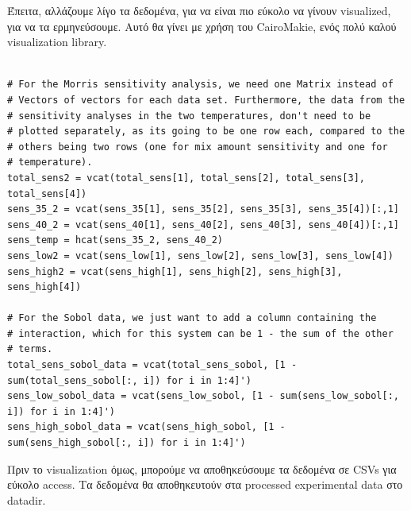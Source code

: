 \documentclass[11pt]{article}
\begin{document}
Έπειτα, αλλάζουμε λίγο τα δεδομένα, για να είναι πιο εύκολο να γίνουν visualized, για να τα ερμηνεύσουμε. Αυτό θα γίνει με χρήση του CairoMakie, ενός πολύ καλού visualization library.

\begin{verbatim}

# For the Morris sensitivity analysis, we need one Matrix instead of
# Vectors of vectors for each data set. Furthermore, the data from the
# sensitivity analyses in the two temperatures, don't need to be
# plotted separately, as its going to be one row each, compared to the
# others being two rows (one for mix amount sensitivity and one for
# temperature).
total_sens2 = vcat(total_sens[1], total_sens[2], total_sens[3], total_sens[4])
sens_35_2 = vcat(sens_35[1], sens_35[2], sens_35[3], sens_35[4])[:,1]
sens_40_2 = vcat(sens_40[1], sens_40[2], sens_40[3], sens_40[4])[:,1]
sens_temp = hcat(sens_35_2, sens_40_2)
sens_low2 = vcat(sens_low[1], sens_low[2], sens_low[3], sens_low[4])
sens_high2 = vcat(sens_high[1], sens_high[2], sens_high[3], sens_high[4])

# For the Sobol data, we just want to add a column containing the
# interaction, which for this system can be 1 - the sum of the other
# terms.
total_sens_sobol_data = vcat(total_sens_sobol, [1 - sum(total_sens_sobol[:, i]) for i in 1:4]')
sens_low_sobol_data = vcat(sens_low_sobol, [1 - sum(sens_low_sobol[:, i]) for i in 1:4]')
sens_high_sobol_data = vcat(sens_high_sobol, [1 - sum(sens_high_sobol[:, i]) for i in 1:4]')

\end{verbatim}

Πριν το visualization όμως, μπορούμε να αποθηκεύσουμε τα δεδομένα σε CSVs για εύκολο access. Τα δεδομένα θα αποθηκευτούν στα processed experimental data στο datadir.
\end{document}
